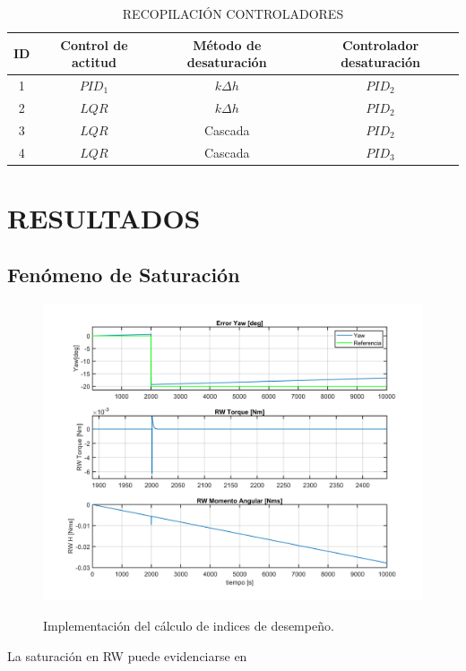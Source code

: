 \begin{table}[h]
	\caption{\MakeUppercase{Recopilación Controladores}}
	\begin{center}
		\begin{tabular}{ c c c c}
			
			ID&  \textbf{Control de actitud} &  \textbf{ Método de desaturación} & \textbf{Controlador desaturación}\\ \hline
			1 &  $PID_1$ & $k\Delta h$ & $PID_2$\\ 
			2 &  $LQR$ & $k\Delta h$ & $PID_2$\\ 
			3 &  $LQR$ & Cascada & $PID_2$\\ 
			4 &  $LQR$ & Cascada  & $PID_3$\\  \hline			
		\end{tabular}
	\end{center}
	\label{table:summary_controllers}
\end{table}
\newpage

\section{RESULTADOS}
\subsection{Fenómeno de Saturación}

\begin{figure}[!ht]
	\begin{center}
		\includegraphics[scale=0.55]{imagenes/resultados/Desaturation.PNG}\\
	\end{center}
	\caption{Implementación del cálculo de indices de desempeño.}
	\label{fig:saturacion}	 	
\end{figure}
La saturación en RW puede evidenciarse en 



